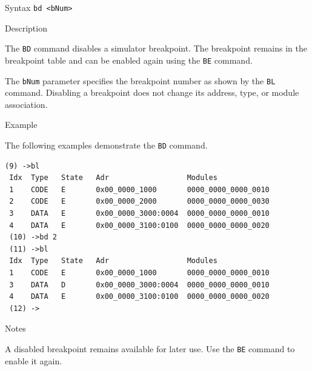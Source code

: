 %
%
\pagebreak
{}

\begin{iPageDescEntry}{Syntax}
\texttt{bd  <bNum>  }
\end{iPageDescEntry}

\begin{iPageDescEntry}{Description}

The \texttt{BD} command disables a simulator breakpoint. The breakpoint
remains in the breakpoint table and can be enabled again using the
\texttt{BE} command.

The \texttt{bNum} parameter specifies the breakpoint number as shown by
the \texttt{BL} command. Disabling a breakpoint does not change its
address, type, or module association.

\end{iPageDescEntry}

\begin{iPageDescEntry}{Example}

The following examples demonstrate the \texttt{BD} command. 

\begin{lstlisting}[style=iPageOpStyle]
 (9) ->bl
 Idx  Type   State   Adr                  Modules         
 1    CODE   E       0x00_0000_1000       0000_0000_0000_0010
 2    CODE   E       0x00_0000_2000       0000_0000_0000_0030
 3    DATA   E       0x00_0000_3000:0004  0000_0000_0000_0010
 4    DATA   E       0x00_0000_3100:0100  0000_0000_0000_0020
 (10) ->bd 2
 (11) ->bl
 Idx  Type   State   Adr                  Modules         
 1    CODE   E       0x00_0000_1000       0000_0000_0000_0010
 3    DATA   D       0x00_0000_3000:0004  0000_0000_0000_0010
 4    DATA   E       0x00_0000_3100:0100  0000_0000_0000_0020
 (12) ->
\end{lstlisting}
\end{iPageDescEntry}

\begin{iPageDescEntry}{Notes}

A disabled breakpoint remains available for later use. Use the
\texttt{BE} command to enable it again.

\end{iPageDescEntry}